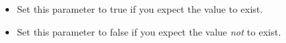 
\begin{itemize}
\item Set this parameter to true if you expect the value to exist. 
\item  Set this parameter to false if you expect the value \emph{not} to exist. 
\end{itemize}
